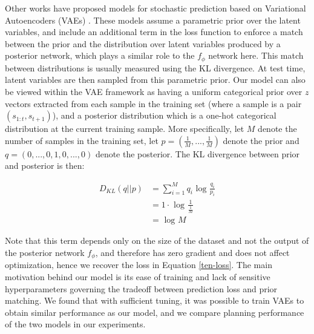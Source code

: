 \documentclass{article} %
\begin{document}
Other works have proposed models for stochastic prediction based on Variational Autoencoders (VAEs) \citep{VAE}.
These models assume a parametric prior over the latent variables, and include an additional term in the loss function to enforce a match between the prior and the distribution over latent variables produced by a posterior network, which plays a similar role to the $f_\phi$ network here.
This match between distributions is usually measured using the KL divergence.
At test time, latent variables are then sampled from this parametric prior.
Our model can also be viewed within the VAE framework as having a uniform categorical prior over $z$ vectors extracted from each sample in the training set (where a sample is a pair $(s_{1:t}, s_{t+1})$), and a posterior distribution which is a one-hot categorical distribution at the current training sample.
More specifically, let $M$ denote the number of samples in the training set, let $p = (\frac{1}{M}, ..., \frac{1}{M})$ denote the prior and $q=(0, ..., 0, 1, 0, ..., 0)$ denote the posterior. The KL divergence between prior and posterior is then:

\begin{align*}
  D_{KL}(q||p) &= \sum_{i=1}^M q_i \mbox{ log } \frac{q_i}{p_i} \\
  &= 1 \cdot \mbox{ log } \frac{1}{\frac{1}{M}} \\
  &= \mbox{ log } M
\end{align*}

Note that this term depends only on the size of the dataset and not the output of the posterior network $f_\phi$, and therefore has zero gradient and does not affect optimization, hence we recover the loss in Equation \ref{ten-loss}.
The main motivation behind our model is its ease of training and lack of sensitive hyperparameters governing the tradeoff between prediction loss and prior matching.
We found that with sufficient tuning, it was possible to train VAEs to obtain similar performance as our model, and we compare planning performance of the two models in our experiments.
\end{document}
